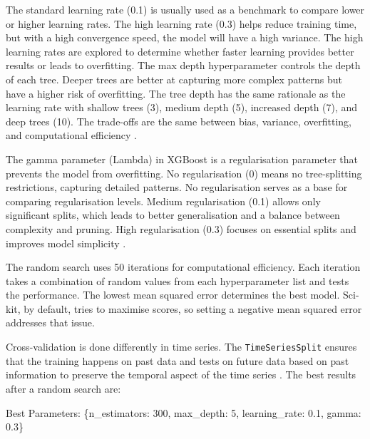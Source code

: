 \documentclass[mstat,12pt]{unswthesis}
\newenvironment{Shaded}{\begin{snugshade}}{\end{snugshade}}
\newcommand{\DecValTok}[1]{\textcolor[rgb]{0.00,0.00,0.81}{#1}}
\newcommand{\FloatTok}[1]{\textcolor[rgb]{0.00,0.00,0.81}{#1}}
\newcommand{\NormalTok}[1]{#1}
\newcommand{\StringTok}[1]{\textcolor[rgb]{0.31,0.60,0.02}{#1}}
\begin{document}
The standard learning rate (0.1) is usually used as a benchmark to
compare lower or higher learning rates. The high learning rate (0.3)
helps reduce training time, but with a high convergence speed, the model
will have a high variance. The high learning rates are explored to
determine whether faster learning provides better results or leads to
overfitting. The max depth hyperparameter controls the depth of each
tree. Deeper trees are better at capturing more complex patterns but
have a higher risk of overfitting. The tree depth has the same rationale
as the learning rate with shallow trees (3), medium depth (5), increased
depth (7), and deep trees (10). The trade-offs are the same between
bias, variance, overfitting, and computational efficiency
\cite{a2022_xgboost}.

The gamma parameter (Lambda) in XGBoost is a regularisation parameter
that prevents the model from overfitting. No regularisation (0) means no
tree-splitting restrictions, capturing detailed patterns. No
regularisation serves as a base for comparing regularisation levels.
Medium regularisation (0.1) allows only significant splits, which leads
to better generalisation and a balance between complexity and pruning.
High regularisation (0.3) focuses on essential splits and improves model
simplicity \cite{a2022_xgboost}.

The random search uses 50 iterations for computational efficiency. Each
iteration takes a combination of random values from each hyperparameter
list and tests the performance. The lowest mean squared error determines
the best model. Sci-kit, by default, tries to maximise scores, so
setting a negative mean squared error addresses that issue.

Cross-validation is done differently in time series. The
\texttt{TimeSeriesSplit} ensures that the training happens on past data
and tests on future data based on past information to preserve the
temporal aspect of the time series \cite{scikit-learn2024}. The best
results after a random search are:

\begin{Shaded}
\begin{Highlighting}[]
\NormalTok{Best Parameters: \{}\StringTok{\textquotesingle{}n\_estimators\textquotesingle{}}\NormalTok{: }\DecValTok{300}\NormalTok{, }
                  \StringTok{\textquotesingle{}max\_depth\textquotesingle{}}\NormalTok{: }\DecValTok{5}\NormalTok{, }
                  \StringTok{\textquotesingle{}learning\_rate\textquotesingle{}}\NormalTok{: }\FloatTok{0.1}\NormalTok{, }
                  \StringTok{\textquotesingle{}gamma\textquotesingle{}}\NormalTok{: }\FloatTok{0.3}\NormalTok{\}}
\end{Highlighting}
\end{Shaded}
\end{document}
